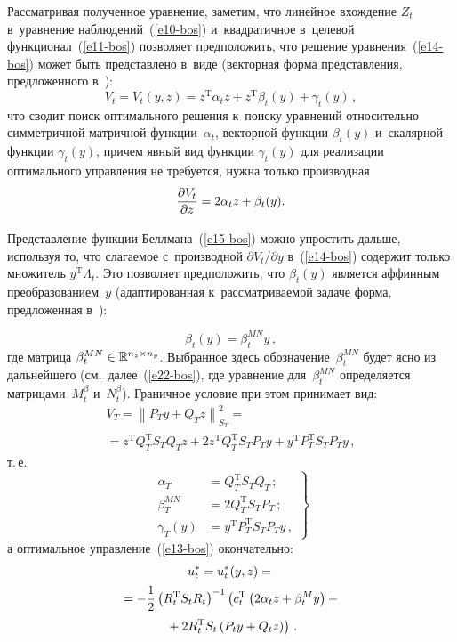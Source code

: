 \begin{multicols}{2}
     Рассматривая полученное уравнение, заметим, что линейное вхождение 
$Z_t$ в~уравнение наблюдений~(\ref{e10-bos}) и~квадратичное в~целевой 
функционал~(\ref{e11-bos}) позволяет предположить, что решение 
уравнения~(\ref{e14-bos}) может быть представлено в~виде (векторная форма 
представления, предложенного в~\cite{16-bos}):
     \begin{equation}
     V_t=V_t(y,z)=z^{\mathrm{T}} \alpha_t z+z^{\mathrm{T}}\beta_t(y)+\gamma_t(y)\,,
     \label{e15-bos}
     \end{equation}
что сводит поиск оптимального решения к~поиску уравнений относительно 
симметричной матричной функции~$\alpha_t$, векторной функции 
$\beta_t(y)$ и~скалярной функции $\gamma_t(y)$, причем явный вид функции 
$\gamma_t(y)$ для реализации оптимального управления не требуется, нужна 
только производная 
$$
\displaystyle\frac{\displaystyle \partial V_t\mathstrut}{\displaystyle \partial z\mathstrut}= 2\alpha_t z+ \beta_t(y).
$$ 
     
     Представление функции Беллмана~(\ref{e15-bos}) можно упростить 
дальше, используя то, что сла\-га\-емое с~производной $\partial V_t/\partial y$ 
в~(\ref{e14-bos}) содержит только множитель $y^{\mathrm{T}}\Lambda_t$. Это позволяет 
предположить, что $\beta_t(y)$ является аффинным преобразованием~$y$ 
(адаптированная к~рассматриваемой задаче форма, предложенная  
в~\cite{17-bos}):


\noindent
     \begin{equation}
     \beta_t(y)=\beta_t^{MN} y\,,
     \label{e16-bos}
      \end{equation}
где матрица $\beta_t^{MN}\hm\in \mathbb{R}^{n_z\times n_y}$. Выбранное 
здесь обозначение~$\beta_t^{MN}$ будет ясно из дальнейшего (см.\ 
далее~(\ref{e22-bos}), где уравнение для~$\beta_t^{MN}$ определяется 
мат\-ри\-ца\-ми~$M_t^\beta$ и~$N_t^\beta$). Граничное условие при этом 
принимает вид: 
\begin{multline*}
V_T=\left\| P_T y+Q_T z\right\|^2_{S_T} ={}\\[6pt]
{}= z^{\mathrm{T}} Q_T^{\mathrm{T}} S_T Q_T z+ 2z^{\mathrm{T}} 
Q_T^{\mathrm{T}} S_T P_T y+ y^{\mathrm{T}} P_T^{\mathrm{T}} S_T P_T y\,,
\end{multline*}
 т.\,е.
\begin{equation}
\left.
\begin{array}{rl}
\alpha_T&= Q_T^{\mathrm{T}} S_T Q_T\,;\\[9pt]
\beta_T^{MN}&=2Q_T^{\mathrm{T}} S_T P_T\,;\\[9pt] 
\gamma_T(y)&=y^{\mathrm{T}} P_T^{\mathrm{T}} S_T P_T y\,,
\end{array}
\right\}
\label{e17-bos}
\end{equation}
а оптимальное управление~(\ref{e13-bos}) окончательно:
\begin{multline*}
u_t^* =u_t^*(y,z) ={}\\
{}=-\displaystyle\frac{\displaystyle 1\mathstrut}{\displaystyle 2\mathstrut}\left( R_t^{\mathrm{T}} S_t R_t\right)^{-1} \left(
\vphantom{R_t^T}
 c_t^{\mathrm{T}} \left( 
2\alpha_t z+\beta_t^M y\right) +{}\right.\\
\left.{}+
2R_t^{\mathrm{T}} S_t\left( P_t y+Q_t z\right)\right)\,.
\end{multline*}
     

\end{multicols}
